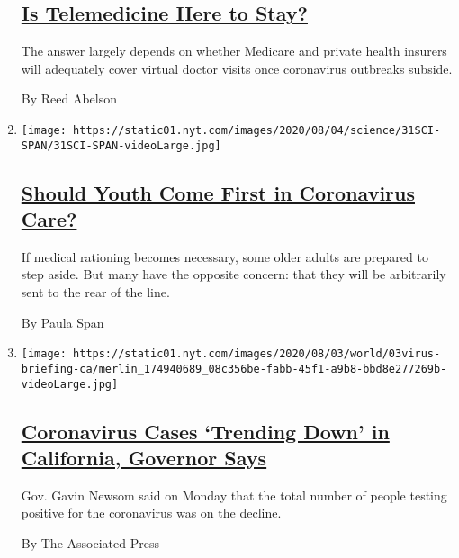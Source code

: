 \begin{enumerate}
  \hypertarget{is-telemedicine-here-to-stay}{%
  \subsection{\texorpdfstring{\href{/2020/08/03/health/covid-telemedicine-congress.html}{Is
  Telemedicine Here to
  Stay?}}{Is Telemedicine Here to Stay?}}\label{is-telemedicine-here-to-stay}}

  The answer largely depends on whether Medicare and private health
  insurers will adequately cover virtual doctor visits once coronavirus
  outbreaks subside.

  By Reed Abelson
\item
  \texttt{[image: https://static01.nyt.com/images/2020/08/04/science/31SCI-SPAN/31SCI-SPAN-videoLarge.jpg]}

  \hypertarget{should-youth-come-first-in-coronavirus-care}{%
  \subsection{\texorpdfstring{\href{/2020/07/31/health/coronavirus-ethics-rationing-elderly.html}{Should
  Youth Come First in Coronavirus
  Care?}}{Should Youth Come First in Coronavirus Care?}}\label{should-youth-come-first-in-coronavirus-care}}

  If medical rationing becomes necessary, some older adults are prepared
  to step aside. But many have the opposite concern: that they will be
  arbitrarily sent to the rear of the line.

  By Paula Span
\item
  \texttt{[image: https://static01.nyt.com/images/2020/08/03/world/03virus-briefing-ca/merlin\_174940689\_08c356be-fabb-45f1-a9b8-bbd8e277269b-videoLarge.jpg]}

  \hypertarget{coronavirus-cases-trending-down-in-california-governor-says}{%
  \subsection{\texorpdfstring{\href{/video/us/100000007271181/california-virus-cases-trend-down.html}{Coronavirus
  Cases `Trending Down' in California, Governor
  Says}}{Coronavirus Cases `Trending Down' in California, Governor Says}}\label{coronavirus-cases-trending-down-in-california-governor-says}}

  Gov. Gavin Newsom said on Monday that the total number of people
  testing positive for the coronavirus was on the decline.

  By The Associated Press
\end{enumerate}

